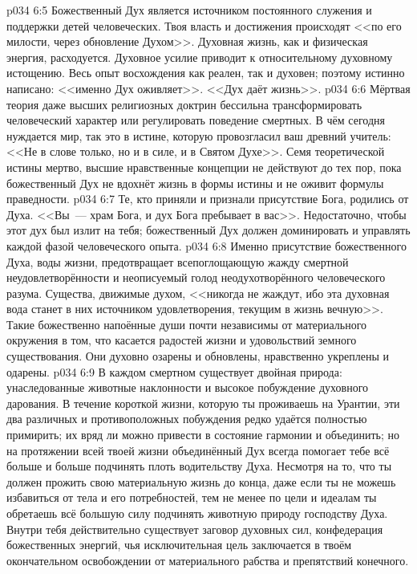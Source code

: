 \vs p034 6:5 \pc Божественный Дух является источником постоянного служения и поддержки детей человеческих. Твоя власть и достижения происходят <<по его милости, через обновление Духом>>. Духовная жизнь, как и физическая энергия, расходуется. Духовное усилие приводит к относительному духовному истощению. Весь опыт восхождения как реален, так и духовен; поэтому истинно написано: <<именно Дух оживляет>>. <<Дух даёт жизнь>>.
\vs p034 6:6 Мёртвая теория даже высших религиозных доктрин бессильна трансформировать человеческий характер или регулировать поведение смертных. В чём сегодня нуждается мир, так это в истине, которую провозгласил ваш древний учитель: <<Не в слове только, но и в силе, и в Святом Духе>>. Семя теоретической истины мертво, высшие нравственные концепции не действуют до тех пор, пока божественный Дух не вдохнёт жизнь в формы истины и не оживит формулы праведности.
\vs p034 6:7 Те, кто приняли и признали присутствие Бога, родились от Духа. <<Вы~--- храм Бога, и дух Бога пребывает в вас>>. Недостаточно, чтобы этот дух был излит на тебя; божественный Дух должен доминировать и управлять каждой фазой человеческого опыта.
\vs p034 6:8 Именно присутствие божественного Духа, воды жизни, предотвращает всепоглощающую жажду смертной неудовлетворённости и неописуемый голод неодухотворённого человеческого разума. Существа, движимые духом, <<никогда не жаждут, ибо эта духовная вода станет в них источником удовлетворения, текущим в жизнь вечную>>. Такие божественно напоённые души почти независимы от материального окружения в том, что касается радостей жизни и удовольствий земного существования. Они духовно озарены и обновлены, нравственно укреплены и одарены.
\vs p034 6:9 \pc В каждом смертном существует двойная природа: унаследованные животные наклонности и высокое побуждение духовного дарования. В течение короткой жизни, которую ты проживаешь на Урантии, эти два различных и противоположных побуждения редко удаётся полностью примирить; их вряд ли можно привести в состояние гармонии и объединить; но на протяжении всей твоей жизни объединённый Дух всегда помогает тебе всё больше и больше подчинять плоть водительству Духа. Несмотря на то, что ты должен прожить свою материальную жизнь до конца, даже если ты не можешь избавиться от тела и его потребностей, тем не менее по цели и идеалам ты обретаешь всё большую силу подчинять животную природу господству Духа. Внутри тебя действительно существует заговор духовных сил, конфедерация божественных энергий, чья исключительная цель заключается в твоём окончательном освобождении от материального рабства и препятствий конечного.
